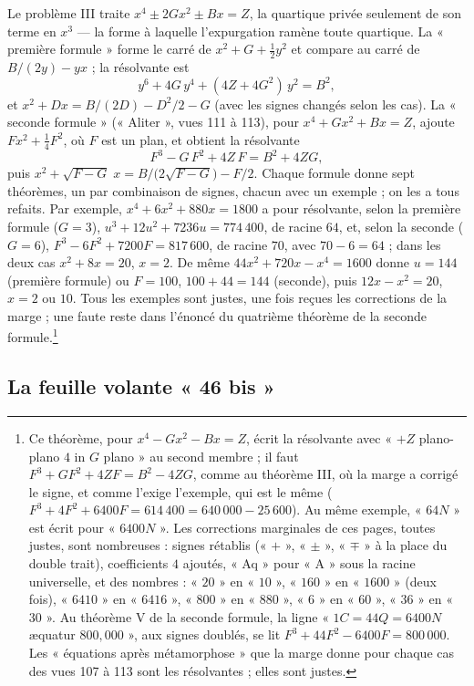 \documentclass[11pt,a4paper]{article}
\begin{document}
Le problème III traite $x^4 \pm 2Gx^2 \pm Bx = Z$, la quartique privée seulement
de son terme en $x^3$ — la forme à laquelle l'expurgation ramène toute
quartique. La « première formule » forme le carré de
$x^2 + G + \tfrac12 y^2$ et compare au carré de $B/(2y) - yx$ ; la résolvante est
\[ y^6 + 4G\,y^4 + (4Z + 4G^2)\,y^2 = B^2 , \]
et $x^2 + Dx = B/(2D) - D^2/2 - G$ (avec les signes changés selon les cas). La
« seconde formule » (« Aliter », vues 111 à 113), pour $x^4 + Gx^2 + Bx = Z$,
ajoute $Fx^2 + \tfrac14F^2$, où $F$ est un plan, et obtient la résolvante
\[ F^3 - G\,F^2 + 4Z\,F = B^2 + 4ZG , \]
puis $x^2 + \sqrt{F - G}\;x = B/\bigl(2\sqrt{F - G}\bigr) - F/2$. Chaque formule
donne sept théorèmes, un par combinaison de signes, chacun avec un exemple ; on
les a tous refaits. Par exemple, $x^4 + 6x^2 + 880x = 1800$ a pour résolvante,
selon la première formule ($G = 3$), $u^3 + 12u^2 + 7236u = 774\,400$, de racine
$64$, et, selon la seconde ($G = 6$), $F^3 - 6F^2 + 7200F = 817\,600$, de racine
$70$, avec $70 - 6 = 64$ ; dans les deux cas $x^2 + 8x = 20$, $x = 2$. De même
$44x^2 + 720x - x^4 = 1600$ donne $u = 144$ (première formule) ou $F = 100$,
$100 + 44 = 144$ (seconde), puis $12x - x^2 = 20$, $x = 2$ ou $10$. Tous les
exemples sont justes, une fois reçues les corrections de la marge ; une faute
reste dans l'énoncé du quatrième théorème de la seconde formule.\footnote{Ce
théorème, pour $x^4 - Gx^2 - Bx = Z$, écrit la résolvante avec
« $+ Z$ plano-plano $4$ in $G$ plano » au second membre ; il faut
$F^3 + GF^2 + 4ZF = B^2 - 4ZG$, comme au théorème III, où la marge a corrigé le
signe, et comme l'exige l'exemple, qui est le même
($F^3 + 4F^2 + 6400F = 614\,400 = 640\,000 - 25\,600$). Au même exemple, « $64N$ »
est écrit pour « $6400N$ ». Les corrections marginales de ces pages, toutes
justes, sont nombreuses : signes rétablis (« $+$ », « $\pm$ », « $\mp$ » à la place du
double trait), coefficients $4$ ajoutés, « Aq » pour « A » sous la racine
universelle, et des nombres : « $20$ » en « $10$ », « $160$ » en « $1600$ » (deux
fois), « $6410$ » en « $6416$ », « $800$ » en « $880$ », « $6$ » en « $60$ »,
« $36$ » en « $30$ ». Au théorème V de la seconde formule, la ligne
« $1C = 44Q = 6400N$ æquatur $800{,}000$ », aux signes doublés, se lit
$F^3 + 44F^2 - 6400F = 800\,000$. Les « équations après métamorphose » que la
marge donne pour chaque cas des vues 107 à 113 sont les résolvantes ; elles sont
justes.}

\subsection*{La feuille volante « 46 bis »}
\end{document}
